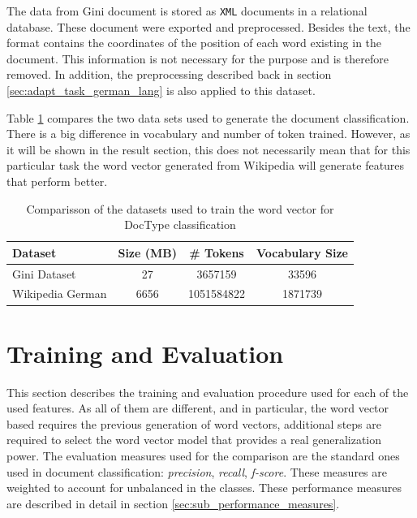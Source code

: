 The data from Gini document is stored as \texttt{XML} documents in a
relational database. These document were exported and preprocessed. Besides
the text, the format contains the coordinates of the position of each word
existing in the document. This information is not necessary for the purpose
and is therefore removed. In addition, the preprocessing described back in
section \ref{sec:adapt_task_german_lang} is also applied to this dataset.

Table \ref{tab:w2v4tc_dataset_comparisson} compares the two data sets used
to generate the document classification. There is a big difference in
vocabulary and number of token trained. However, as it will be shown in the result
section, this does not necessarily mean that for this particular task the
word vector generated from Wikipedia will generate features that perform better.

\begin{table}[h]

  \centering
  \caption{Comparisson of the datasets used to train the word vector for
    \ac{DocType} classification}
  \label{tab:w2v4tc_dataset_comparisson}

\small
\begin{tabular}{|l|c|c|c|}
\hline
Dataset           &  Size (MB)  &    \# Tokens  &  Vocabulary  Size  \\
\hline
 Gini Dataset      &         27  &     3657159  &             33596  \\
 Wikipedia German  &       6656  &  1051584822  &           1871739  \\
\hline
\end{tabular}

\end{table}


\section{Training and Evaluation}
\label{sec:w2v4tc_training-evaluation}

This section describes the training and evaluation procedure used for each of
the used features. As all of them are different, and in
particular, the word vector based requires  the previous generation
of word vectors, additional steps are required to select the word
vector model that provides a real generalization power.  
The evaluation measures used for the comparison  are the standard ones used in document
classification: \textit{precision}, \textit{recall}, \textit{f-score}. These
measures are  weighted to account for unbalanced in the classes. These
performance measures are described in detail  in section \ref{sec:sub_performance_measures}.

